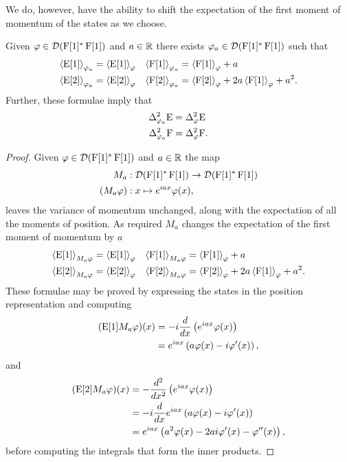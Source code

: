 We do, however, have the ability to shift the expectation of the first moment of momentum of the states as we choose. 
\begin{lem}\label{lem:infinite-dim-ur-shift-momentum}
  Given $\varphi\in\mathcal{D}(\operatorname{F}[1]^*\operatorname{F}[1])$ and $a\in\mathbb{R}$ there exists $\varphi_a\in\mathcal{D}(\operatorname{F}[1]^*\operatorname{F}[1])$ such that
  \begin{align}
    \left\langle{\operatorname{E}[1]}\right\rangle_{\varphi_a} &= \left\langle{\operatorname{E}[1]}\right\rangle_{\varphi} & \left\langle{\operatorname{F}[1]}\right\rangle_{\varphi_a} &= \left\langle{\operatorname{F}[1]}\right\rangle_{\varphi} + a\\
    \left\langle{\operatorname{E}[2]}\right\rangle_{\varphi_a} &= \left\langle{\operatorname{E}[2]}\right\rangle_{\varphi}& \left\langle{\operatorname{F}[2]}\right\rangle_{\varphi_a} &= \left\langle{\operatorname{F}[2]}\right\rangle_{\varphi} + 2a\left\langle{\operatorname{F}[1]}\right\rangle_{\varphi} + a^2.
  \end{align}
  Further, these formulae imply that
  \begin{align}
    \var[\varphi_a]{\ope} &= \var[\varphi]{\ope}\\
    \var[\varphi_a]{\opf} &= \var[\varphi]{\opf}.
  \end{align}
\end{lem}
\begin{proof}
Given $\varphi\in\mathcal{D}(\operatorname{F}[1]^*\operatorname{F}[1])$ and $a\in\mathbb{R}$ the map
\begin{align}
  M_a &:\mathcal{D}(\operatorname{F}[1]^*\operatorname{F}[1])\to\mathcal{D}(\operatorname{F}[1]^*\operatorname{F}[1])\\
  (M_a\varphi)&:x\mapsto e^{i a x}\varphi(x),
\end{align}
leaves the variance of momentum unchanged, along with the expectation of all the moments of position. As required $M_a$ changes the expectation of the first moment of momentum by $a$
\begin{align}
  \left\langle{\operatorname{E}[1]}\right\rangle_{M_a\varphi} &= \left\langle{\operatorname{E}[1]}\right\rangle_{\varphi} & \left\langle{\operatorname{F}[1]}\right\rangle_{M_a\varphi} &= \left\langle{\operatorname{F}[1]}\right\rangle_{\varphi} + a\\
  \left\langle{\operatorname{E}[2]}\right\rangle_{M_a\varphi} &= \left\langle{\operatorname{E}[2]}\right\rangle_{\varphi}& \left\langle{\operatorname{F}[2]}\right\rangle_{M_a\varphi} &= \left\langle{\operatorname{F}[2]}\right\rangle_{\varphi} + 2a\left\langle{\operatorname{F}[1]}\right\rangle_{\varphi} + a^2.
\end{align}
These formulae may be proved by expressing the states in the position representation and computing
\begin{align}
  (\operatorname{E}[1]M_a\varphi)(x) &= -i \frac{d}{dx}\left(e^{iax}\varphi(x)\right)\\
                         &= e^{iax}\left(a\varphi(x) -i\varphi^\prime(x)\right),
\end{align}
and
\begin{align}
  (\operatorname{E}[2]M_a\varphi)(x) &= - \frac{d^2}{dx^2}\left(e^{iax}\varphi(x)\right)\\
                         &= -i\frac{d}{dx} e^{iax}\left(a\varphi(x) -i\varphi^\prime(x)\right)\\
                         &= e^{iax}\left(a^2\varphi(x) -2 a i\varphi^\prime(x)- \varphi^{\prime\prime}(x)\right),
\end{align}
before computing the integrals that form the inner products.
\end{proof}
